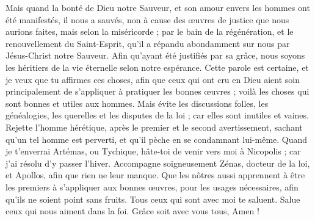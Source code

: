 \begin{multicols}{2}
Mais quand la bonté de Dieu notre Sauveur, et son amour envers les hommes ont été manifestés, il nous a sauvés,
non à cause des œuvres de justice que nous aurions faites, mais selon la miséricorde ; par le bain de la régénération, et le renouvellement du Saint-Esprit,
qu’il a répandu abondamment sur nous par Jésus-Christ notre Sauveur.
Afin qu'ayant été justifiés par sa grâce, nous soyons les héritiers de la vie éternelle selon notre espérance.
Cette parole est certaine, et je veux que tu affirmes ces choses, afin que ceux qui ont cru en Dieu aient soin principalement de s'appliquer à pratiquer les bonnes œuvres ; voilà les choses qui sont bonnes et utiles aux hommes.
Mais évite les discussions folles, les généalogies, les querelles et les disputes de la loi ; car elles sont inutiles et vaines.
Rejette l'homme hérétique, après le premier et le second avertissement,
sachant qu'un tel homme est perverti, et qu'il pèche en se condamnant lui-même.
Quand je t’enverrai Artémas, ou Tychique, hâte-toi de venir vers moi à Nicopolis ; car j'ai résolu d'y passer l'hiver.
Accompagne soigneusement Zénas, docteur de la loi, et Apollos, afin que rien ne leur manque.
Que les nôtres aussi apprennent à être les premiers à s'appliquer aux bonnes œuvres, pour les usages nécessaires, afin qu'ils ne soient point sans fruits.
Tous ceux qui sont avec moi te saluent. Salue ceux qui nous aiment dans la foi. Grâce soit avec vous tous, Amen !
\PPE{}
\end{multicols}
